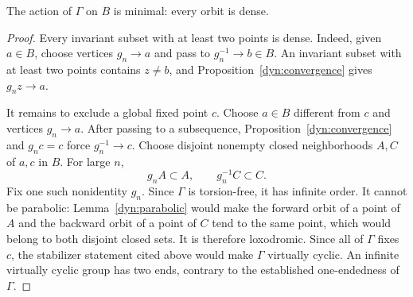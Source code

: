 \begin{proposition}\label{dyn:minimal}
The action of $\Gamma$ on $B$ is minimal: every orbit is dense.
\end{proposition}

\begin{proof}
Every invariant subset with at least two points is dense. Indeed,
given $a\in B$, choose vertices $g_n\to a$ and pass to
$g_n^{-1}\to b\in B$. An invariant subset with at least two points
contains $z\ne b$, and Proposition~\ref{dyn:convergence} gives
$g_nz\to a$.

It remains to exclude a global fixed point $c$. Choose $a\in B$
different from $c$ and vertices $g_n\to a$. After passing to a
subsequence, Proposition~\ref{dyn:convergence} and $g_nc=c$ force
$g_n^{-1}\to c$. Choose disjoint nonempty closed neighborhoods $A,C$
of $a,c$ in $B$. For large $n$,
\[
 g_nA\subset A,\qquad g_n^{-1}C\subset C.
\]
Fix one such nonidentity $g_n$. Since $\Gamma$ is torsion-free, it has
infinite order. It cannot be parabolic: Lemma~\ref{dyn:parabolic}
would make the forward orbit of a point of $A$ and the backward
orbit of a point of $C$ tend to the same point, which would belong to
both disjoint closed sets. It is therefore loxodromic. Since all of
$\Gamma$ fixes $c$, the stabilizer statement cited above would make
$\Gamma$ virtually cyclic. An infinite virtually cyclic group has
two ends, contrary to the established one-endedness of $\Gamma$.
\end{proof}
